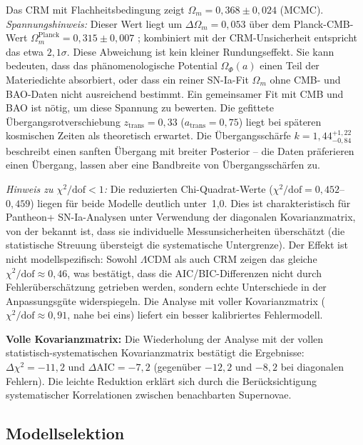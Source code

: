 \documentclass[aps,prd,twocolumn,superscriptaddress,nofootinbib]{revtex4-2}
\begin{document}
Das CRM mit Flachheitsbedingung zeigt $\Omega_m = 0{,}368 \pm 0{,}024$ (MCMC). \textit{Spannungshinweis:} Dieser Wert liegt um $\Delta\Omega_m = 0{,}053$ über dem Planck-CMB-Wert $\Omega_m^{\mathrm{Planck}} = 0{,}315 \pm 0{,}007$ \cite{Planck2020}; kombiniert mit der CRM-Unsicherheit entspricht das etwa $2{,}1\sigma$. Diese Abweichung ist kein kleiner Rundungseffekt. Sie kann bedeuten, dass das phänomenologische Potential $\Omega_\Phi(a)$ einen Teil der Materiedichte absorbiert, oder dass ein reiner SN-Ia-Fit $\Omega_m$ ohne CMB- und BAO-Daten nicht ausreichend bestimmt. Ein gemeinsamer Fit mit CMB und BAO ist nötig, um diese Spannung zu bewerten. Die gefittete Übergangsrotverschiebung $z_{\mathrm{trans}} = 0{,}33$ ($a_{\mathrm{trans}} = 0{,}75$) liegt bei späteren kosmischen Zeiten als theoretisch erwartet. Die Übergangsschärfe $k = 1{,}44^{+1{,}22}_{-0{,}84}$ beschreibt einen sanften Übergang mit breiter Posterior -- die Daten präferieren einen Übergang, lassen aber eine Bandbreite von Übergangsschärfen zu.

\textit{Hinweis zu $\chi^2/\mathrm{dof} < 1$:} Die reduzierten Chi-Quadrat-Werte ($\chi^2/\mathrm{dof} = 0{,}452$--$0{,}459$) liegen für beide Modelle deutlich unter~1{,}0. Dies ist charakteristisch für Pantheon+ SN-Ia-Analysen unter Verwendung der diagonalen Kovarianzmatrix, von der bekannt ist, dass sie individuelle Messunsicherheiten überschätzt (die statistische Streuung übersteigt die systematische Untergrenze). Der Effekt ist nicht modellspezifisch: Sowohl $\Lambda$CDM als auch CRM zeigen das gleiche $\chi^2/\mathrm{dof} \approx 0{,}46$, was bestätigt, dass die AIC/BIC-Differenzen nicht durch Fehlerüberschätzung getrieben werden, sondern echte Unterschiede in der Anpassungsgüte widerspiegeln. Die Analyse mit voller Kovarianzmatrix ($\chi^2/\mathrm{dof} \approx 0{,}91$, nahe bei eins) liefert ein besser kalibriertes Fehlermodell.

\textbf{Volle Kovarianzmatrix:} Die Wiederholung der Analyse mit der vollen statistisch-systematischen Kovarianzmatrix bestätigt die Ergebnisse: $\Delta\chi^2 = -11{,}2$ und $\Delta\mathrm{AIC} = -7{,}2$ (gegenüber $-12{,}2$ und $-8{,}2$ bei diagonalen Fehlern). Die leichte Reduktion erklärt sich durch die Berücksichtigung systematischer Korrelationen zwischen benachbarten Supernovae.

\subsection{Modellselektion}
\label{subsec:modelselection}
\end{document}
